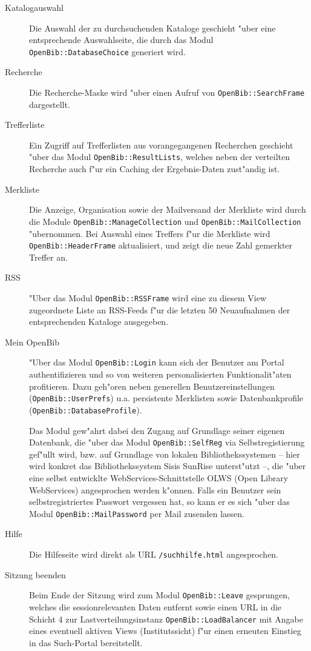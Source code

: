 \documentclass[11pt, twoside, a4paper, BCOR8mm, DIV12, bibtotoc,idxtotoc]{scrbook}
\begin{document}
\begin{description}
\item[Katalogauswahl] Die Auswahl der zu durchsuchenden Kataloge geschieht
  "uber eine entsprechende Aus\-wahl\-seite, die durch das Modul
  \texttt{OpenBib::DatabaseChoice} generiert wird.
\item[Recherche] Die Recherche-Maske wird "uber einen Aufruf von
  \texttt{OpenBib::SearchFrame} dargestellt.
\item[Trefferliste] Ein Zugriff auf Trefferlisten aus vorangegangenen
  Recherchen geschieht "uber das Modul \texttt{OpenBib::ResultLists},
  welches neben der verteilten Recherche auch f"ur ein Caching der
  Ergebnis-Daten zust"andig ist.
\item[Merkliste] Die Anzeige, Organisation sowie der Mailversand der
  Merkliste wird durch die Module
  \texttt{OpenBib::ManageCollection} und \texttt{OpenBib::MailCollection}
  "uber\-nom\-men. Bei Auswahl eines Treffers f"ur die Merkliste wird
  \texttt{OpenBib::HeaderFrame} aktualisiert, und zeigt die neue Zahl
  gemerkter Treffer an.
\item[RSS] "Uber das Modul \texttt{OpenBib::RSSFrame} wird eine zu
  diesem View zugeordnete Liste an RSS-Feeds f"ur die letzten 50
  Neuaufnahmen der entsprechenden Kataloge ausgegeben.
\item[Mein OpenBib] "Uber das Modul \texttt{OpenBib::Login}
  kann sich der Benutzer am Portal authentifizieren und so von
  weiteren personalisierten Funktionalit"aten profitieren. Dazu
  geh"oren neben generellen Benutzereinstellungen
  (\texttt{OpenBib::UserPrefs}) u.a. per\-sis\-ten\-te Merklisten sowie
  Datenbankprofile (\texttt{OpenBib::DatabaseProfile}).

  Das Modul gew"ahrt dabei den Zugang auf Grundlage seiner eigenen
  Datenbank, die "uber das Modul \texttt{OpenBib::SelfReg} via
  Selbstregistierung gef"ullt wird, bzw. auf Grundlage von lokalen
  Bibliothekssystemen -- hier wird konkret das Bibliothekssystem Sisis
  SunRise unterst"utzt --, die "uber eine selbst entwicklte
  WebServices-Schnittstelle OLWS (Open Library WebServices)
  angesprochen werden k"onnen. Falls ein Benutzer sein
  selbstregistriertes Passwort vergessen hat, so kann er es sich "uber
  das Modul \texttt{OpenBib::MailPassword} per Mail zusenden lassen.
\item[Hilfe] Die Hilfeseite wird direkt als URL
  \texttt{/suchhilfe.html} angesprochen.
\item[Sitzung beenden] Beim Ende der Sitzung wird zum Modul
  \texttt{OpenBib::Leave} gesprungen, welches die sessionrelevanten Daten
  entfernt sowie einen URL in die Schicht 4 zur Lastver\-teilungs\-instanz
  \texttt{OpenBib::LoadBalancer} mit Angabe eines eventuell aktiven Views
  (Institutssicht) f"ur einen er\-neu\-ten Einstieg in das Such-Portal
  bereitstellt.

\end{description}
\end{document}
